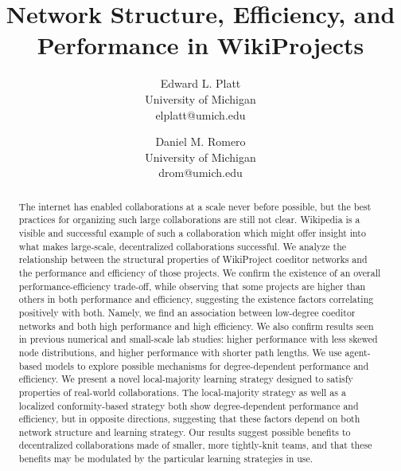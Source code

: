 \documentclass[letterpaper,twocolumn,10pt]{article}
\newcommand{\+}{\phantom{-}}
\begin{document}
\title{Network Structure, Efficiency, and Performance in WikiProjects}
\author{
Edward L. Platt \\
University of Michigan\\
elplatt@umich.edu
\and
Daniel M. Romero\\
University of Michigan\\
drom@umich.edu
}
\date{}
\maketitle


\begin{abstract}
\small
The internet has enabled collaborations at a scale never before possible,
but the best practices for organizing such large collaborations are still not clear.
Wikipedia is a visible and successful example of such a collaboration which might offer
insight into what makes large-scale, decentralized collaborations successful.
We analyze the relationship between the structural properties of WikiProject coeditor networks
and the performance and efficiency of those projects.
We confirm the existence of an overall performance-efficiency trade-off,
while observing that some projects are higher than others in both performance
and efficiency,
suggesting the existence factors correlating positively with both.
Namely, we find an association between low-degree coeditor networks
and both high performance and high efficiency.
We also confirm results seen in previous numerical and small-scale lab studies:
higher performance with less skewed node distributions,
and higher performance with shorter path lengths.
We use agent-based models to explore possible mechanisms for
degree-dependent performance and efficiency.
We present a novel local-majority learning strategy designed to satisfy properties
of real-world collaborations.
The local-majority strategy as well as a localized conformity-based strategy
both show degree-dependent performance and efficiency,
but in opposite directions,
suggesting that these factors depend on both network structure and learning strategy.
Our results suggest 
possible benefits to decentralized collaborations made of smaller,
more tightly-knit teams,
and that these benefits may be modulated by the particular learning strategies
in use.
\end{abstract}

\maketitle
\end{document}
